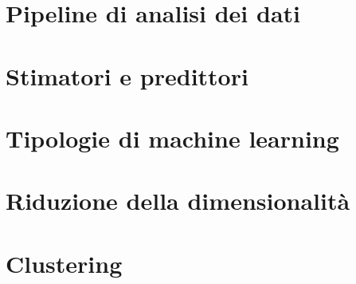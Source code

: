 \documentclass{article}
\begin{document}
\newgeometry{}

\tableofcontents

\section{Pipeline di analisi dei dati}


\section{Stimatori e predittori}


\section{Tipologie di machine learning}


\section{Riduzione della dimensionalità}


\section{Clustering}

\end{document}
